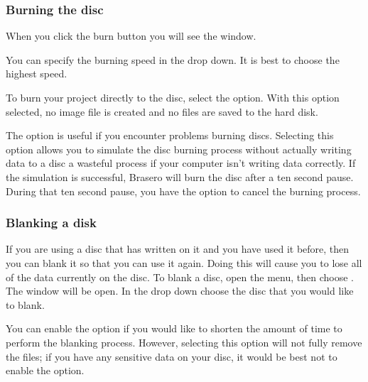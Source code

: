 \subsubsection{Burning the disc}

When you click the burn button you will see the  window.

You can specify the burning speed in the  drop down. It is best to choose the highest speed.

To burn your project directly to the disc, select the  option. With this option selected, no image file is created and no files are saved to the hard disk.

The  option is useful if you encounter
problems burning discs. Selecting this option allows you to simulate the disc
burning process without actually writing data to a disc \dash a wasteful process
if your computer isn't writing data correctly. If the simulation is successful,
Brasero will burn the disc after a ten second pause. During that ten second
pause, you have the option to cancel the burning process.

\subsubsection{Blanking a disk}

If you are using a disc that has  written on it and you have used it before, then you can blank it so that you can use it again. Doing this will cause you to lose all of the data currently on the disc. To blank a disc, open the  menu, then choose . The  window will be open. In the  drop down choose the disc that you would like to blank.

You can enable the  option if you would like to shorten the amount of time to perform the blanking process. However, selecting this option will not fully remove the files; if you have any sensitive data on your disc, it would be best not to enable the  option.

